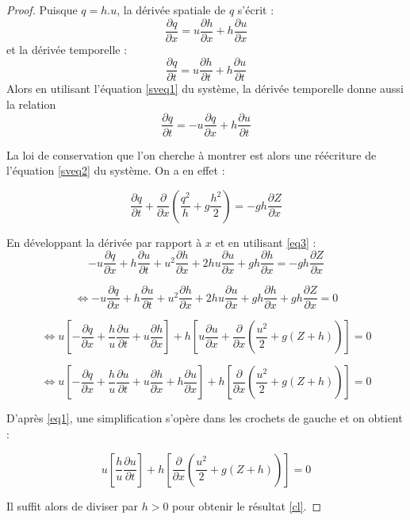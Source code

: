 \documentclass[
11pt, %
francais, %
singlespacing, %
headsepline, %
]{MastersDoctoralThesis} %
\theoremstyle{definition}
\begin{document}
\begin{proof}
Puisque $q=h.u$, la dérivée spatiale de $q$ s'écrit : \begin{equation}\frac{\partial q}{\partial x} = u\frac{\partial h}{\partial x}+h\frac{\partial u}{\partial x} \label{eq1}\end{equation}
et la dérivée temporelle : \begin{equation} \frac{\partial q}{\partial t} =  u\frac{\partial h}{\partial t} +  h\frac{\partial u}{\partial t} \label{eq2} \end{equation}
Alors en utilisant l'équation \ref{sveq1} du système, la dérivée temporelle donne aussi la relation \begin{equation}  \frac{\partial q}{\partial t}=-u\frac{\partial q}{\partial x}+h\frac{\partial u}{\partial t} \label{eq3}\end{equation}

La loi de conservation que l'on cherche à montrer est alors une réécriture de l'équation \ref{sveq2} du système. On a en effet :

$$
\frac{\partial q}{\partial t} + \frac{\partial }{\partial x}(\frac{q^{2}}{h}+g\frac{h^{2}}{2}) = -gh\frac{\partial Z}{\partial x}
$$

En développant la dérivée par rapport à $x$ et en utilisant \eqref{eq3} : 
$$
-u\frac{\partial q}{\partial x}+h\frac{\partial u}{\partial t}+u^{2}\frac{\partial h }{\partial x}+2hu\frac{\partial u}{\partial x} +gh\frac{\partial h}{\partial x}= -gh\frac{\partial Z}{\partial x}
$$

$$
\Leftrightarrow -u\frac{\partial q}{\partial x}+h\frac{\partial u}{\partial t}+u^{2}\frac{\partial h }{\partial x}+2hu\frac{\partial u}{\partial x} +gh\frac{\partial h}{\partial x} + gh\frac{\partial Z}{\partial x} =0
$$

$$
\Leftrightarrow u\left[-\frac{\partial q}{\partial x}+\frac{h}{u}\frac{\partial u}{\partial t}+u\frac{\partial h }{\partial x}\right]+h\left[u \frac{\partial u}{\partial x}+\frac{\partial}{\partial x}(\frac{u^{2}}{2}+g(Z+h))\right] =0
$$

$$
\Leftrightarrow u\left[-\frac{\partial q}{\partial x}+\frac{h}{u}\frac{\partial u}{\partial t}+u\frac{\partial h }{\partial x} + h\frac{\partial u }{\partial x}\right]+h\left[\frac{\partial}{\partial x}(\frac{u^{2}}{2}+g(Z+h))\right] =0
$$


D'après \eqref{eq1}, une simplification s'opère dans les crochets de gauche et on obtient :

$$
u\left[\frac{h}{u}\frac{\partial u}{\partial t}\right]+h\left[\frac{\partial}{\partial x}(\frac{u^{2}}{2}+g(Z+h))\right] =0
$$

Il suffit alors de diviser par $h>0$ pour obtenir le résultat \eqref{cl}.

\end{proof}
\end{document}
